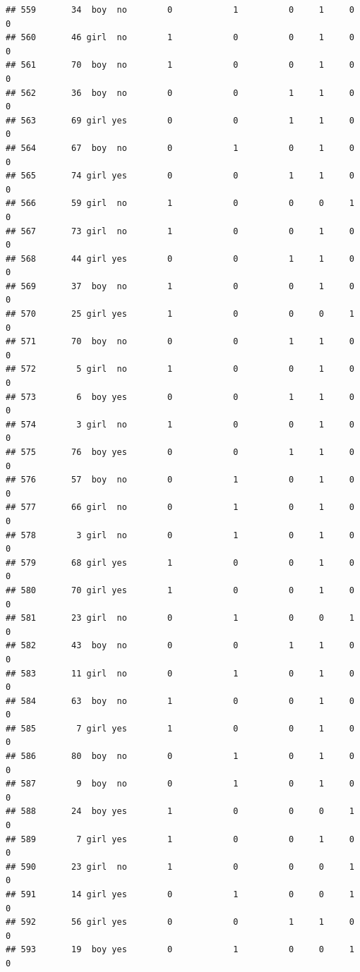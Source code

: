 \documentclass[man]{apa6}
\begin{document}
\begin{verbatim}
## 559       34  boy  no        0            1          0     1     0     0
## 560       46 girl  no        1            0          0     1     0     0
## 561       70  boy  no        1            0          0     1     0     0
## 562       36  boy  no        0            0          1     1     0     0
## 563       69 girl yes        0            0          1     1     0     0
## 564       67  boy  no        0            1          0     1     0     0
## 565       74 girl yes        0            0          1     1     0     0
## 566       59 girl  no        1            0          0     0     1     0
## 567       73 girl  no        1            0          0     1     0     0
## 568       44 girl yes        0            0          1     1     0     0
## 569       37  boy  no        1            0          0     1     0     0
## 570       25 girl yes        1            0          0     0     1     0
## 571       70  boy  no        0            0          1     1     0     0
## 572        5 girl  no        1            0          0     1     0     0
## 573        6  boy yes        0            0          1     1     0     0
## 574        3 girl  no        1            0          0     1     0     0
## 575       76  boy yes        0            0          1     1     0     0
## 576       57  boy  no        0            1          0     1     0     0
## 577       66 girl  no        0            1          0     1     0     0
## 578        3 girl  no        0            1          0     1     0     0
## 579       68 girl yes        1            0          0     1     0     0
## 580       70 girl yes        1            0          0     1     0     0
## 581       23 girl  no        0            1          0     0     1     0
## 582       43  boy  no        0            0          1     1     0     0
## 583       11 girl  no        0            1          0     1     0     0
## 584       63  boy  no        1            0          0     1     0     0
## 585        7 girl yes        1            0          0     1     0     0
## 586       80  boy  no        0            1          0     1     0     0
## 587        9  boy  no        0            1          0     1     0     0
## 588       24  boy yes        1            0          0     0     1     0
## 589        7 girl yes        1            0          0     1     0     0
## 590       23 girl  no        1            0          0     0     1     0
## 591       14 girl yes        0            1          0     0     1     0
## 592       56 girl yes        0            0          1     1     0     0
## 593       19  boy yes        0            1          0     0     1     0

\end{verbatim}
\end{document}
